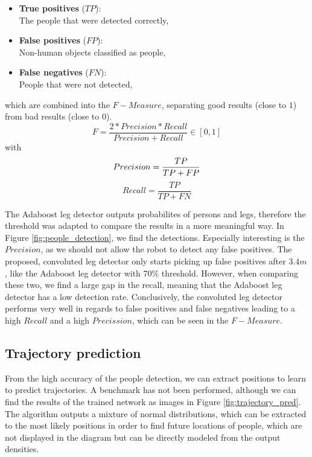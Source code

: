 \begin{itemize}
	\item \textbf{True positives} ($TP$):\\The people that were detected correctly,
	\item \textbf{False positives} ($FP$):\\Non-human objects classified as people,
	\item \textbf{False negatives} ($FN$):\\People that were not detected,
\end{itemize}
which are combined into the $F-Measure$, separating good results (close to $1$) from bad results (close to $0$).
\begin{equation}
	F=\frac{2*Precision*Recall}{Precision+Recall} \in \left[ 0,1 \right]
\end{equation}
with
\begin{equation}
	Precision = \frac{TP}{TP + FP}\\
\end{equation}
\begin{equation}
	Recall = \frac{TP}{TP + FN}
\end{equation}

The Adaboost leg detector outputs probabilites of persons and legs, therefore the threshold was adapted to compare the results in a more meaningful way. In Figure \ref{fig:people_detection}, we find the detections. Especially interesting is the $Precision$, as we should not allow the robot to detect any false positives. The proposed, convoluted leg detector only starts picking up false positives after $3.4 m$, like the Adaboost leg detector with 70\% threshold. However, when comparing these two, we find a large gap in the recall, meaning that the Adaboost leg detector has a low detection rate.
Conclusively, the convoluted leg detector performs very well in regards to false positives and false negatives leading to a high $Recall$ and a high $Precission$, which can be seen in the $F-Measure$.


\subsection{Trajectory prediction}

From the high accuracy of the people detection, we can extract positions to learn to predict trajectories. A benchmark has not been performed, although we can find the results of the trained network as images in Figure \ref{fig:trajectory_pred}. The algorithm outputs a mixture of normal distributions, which can be extracted to the most likely positions in order to find future locations of people, which are not displayed in the diagram but can be directly modeled from the output densities.

